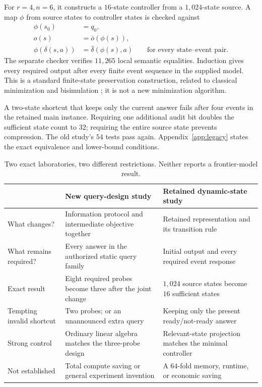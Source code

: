 \documentclass[11pt,letterpaper]{article}
\theoremstyle{remark}\newtheorem{remark}{Remark}[section]
\begin{document}
For $r=4,n=6$, it constructs a $16$-state controller from a $1{,}024$-state source. A map $\phi$ from source states to controller states is checked against
\begin{align}
 \phi(s_0)&=q_0,\\
 o(s)&=\bar o(\phi(s)),\\
 \phi(\delta(s,a))&=\bar\delta(\phi(s),a)
 \qquad\text{for every state--event pair}.\label{eq:futurebridge}
\end{align}
The separate checker verifies $11{,}265$ local semantic equalities. Induction gives every required output after every finite event sequence in the supplied model. This is a standard finite-state preservation construction, related to classical minimization and bisimulation \citep{hopcroft1971,dean1997}; it is not a new minimization algorithm.

A two-state shortcut that keeps only the current answer fails after four events in the retained main instance. Requiring one additional audit bit doubles the sufficient state count to $32$; requiring the entire source state prevents compression. The old study's $54$ tests pass again. Appendix~\ref{app:legacy} states the exact equivalence and lower-bound conditions.

\begin{table}[htbp]
\centering\small
\caption{Two exact laboratories, two different restrictions. Neither reports a frontier-model result.}
\begin{tabularx}{\linewidth}{@{}P{.22\linewidth}YY@{}}
\toprule
 & New query-design study & Retained dynamic-state study\\
\midrule
What changes? & Information protocol and intermediate objective together & Retained representation and its transition rule\\
What remains required? & Every answer in the authorized static query family & Initial output and every required event response\\
Exact result & Eight required probes become three after the joint change & $1{,}024$ source states become $16$ sufficient states\\
Tempting invalid shortcut & Two probes; or an unannounced extra query & Keeping only the present ready/not-ready answer\\
Strong control & Ordinary linear algebra matches the three-probe design & Relevant-state projection matches the minimal controller\\
Not established & Total compute saving or general experiment invention & A $64$-fold memory, runtime, or economic saving\\
\bottomrule
\end{tabularx}
\end{table}
\end{document}
